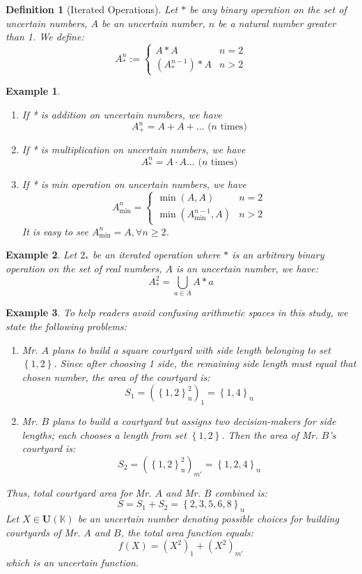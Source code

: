 \documentclass[a4paper,12pt, twoside]{memoir}
\newtheorem{definition}{Definition}[chapter]
\newtheorem{example}{Example}[chapter]
\newcommand{\set}[1]{\left\{#1\right\}} %
\newcommand{\s}[1]{\set{#1}_\mathrm{u}} %
\newcommand{\tsbd}[1]{\mathbf{U}(\mathbb{#1})}
\newcommand{\kgdd}[1]{\left(#1\right)_1} %
\newcommand{\kgdtmr}[1]{\left(#1\right)_{m'}} %
\begin{document}
\begin{definition}[Iterated Operations]
	Let $*$ be any binary operation on the set of uncertain numbers, $A$ be an uncertain number, $n$ be a natural number greater than 1. We define:
	$$A^{n}_{*} := \begin{cases}
			A*A                        & n=2   \\
			\left(A^{n-1}_*\right) * A & n > 2
		\end{cases}$$
\end{definition}

\begin{example}
	\begin{enumerate}[leftmargin=*]
		\item If * is addition on uncertain numbers, we have
		      $$A^n_+ = A+A+... \text{ ($n$ times)}$$
		\item If * is multiplication on uncertain numbers, we have
		      $$A^n_* = A \cdot A \dots \text{ ($n$ times)}$$
		\item If * is min operation on uncertain numbers, we have
		      $$A^n_{\min} = \begin{cases}
				      \min(A,A)                          & n=2   \\
				      \min\left(A^{n-1}_{\min}, A\right) & n > 2
			      \end{cases}$$
		      It is easy to see $A^n_{\min} = A, \forall n \geq 2$.
	\end{enumerate}
\end{example}

\begin{example}
	Let $2_*$ be an iterated operation where $*$ is an arbitrary binary operation on the set of real numbers, $A$ is an uncertain number, we have:
	\[A^2_* = \bigcup_{a \in A} A * a \]
\end{example}

\begin{example}
	To help readers avoid confusing arithmetic spaces in this study, we state the following problems:
	\begin{enumerate}[leftmargin=*]
		\item Mr. $A$ plans to build a square courtyard with side length belonging to set $\set{1,2}$. Since after choosing 1 side, the remaining side length must equal that chosen number, the area of the courtyard is:
		      \[S_1 = \kgdd{\s{1,2}^2} = \s{1,4}\]
		\item Mr. $B$ plans to build a courtyard but assigns two decision-makers for side lengths; each chooses a length from set $\set{1,2}$. Then the area of Mr. $B$'s courtyard is:
		      \[S_2 = \kgdtmr{\s{1,2}^2} =\s{1,2,4}\]
	\end{enumerate}
	Thus, total courtyard area for Mr. $A$ and Mr. $B$ combined is:
	\[S= S_1 + S_2 = \s{2, 3, 5, 6, 8}\]
	Let $X \in \tsbd{K}$ be an uncertain number denoting possible choices for building courtyards of Mr. $A$ and $B$, the total area function equals:
	\[f(X) = \kgdd{X^2} + \kgdtmr{X^2}\]
	which is an uncertain function.
\end{example}
\end{document}
